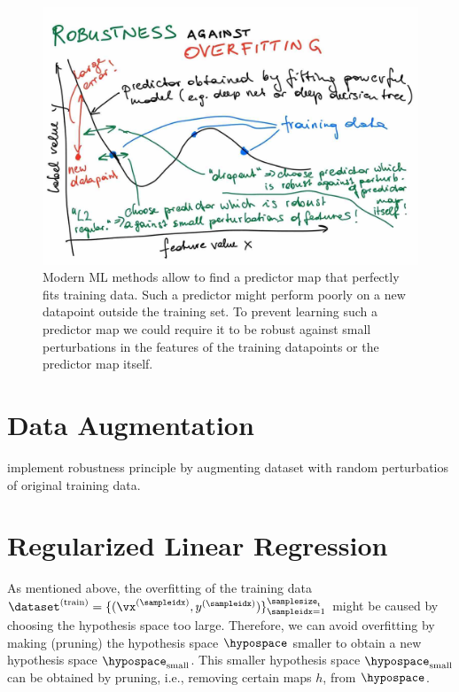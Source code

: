 \documentclass[12pt]{report}
\begin{document}
 \begin{figure}[htbp]
	\centering
	\includegraphics[width=\textwidth]{RobustnessOverfitting.jpg}  
	\caption{Modern ML methods allow to find a predictor map that perfectly fits 
		training data. Such a predictor might perform poorly on a new datapoint 
		outside the training set. To prevent learning such a predictor 
		map we could require it to be robust against small perturbations in the features of the 
        training datapoints or the predictor map itself.}
	\label{fig_polyn_training}
\end{figure}

\section{Data Augmentation} 
\label{sec_data_augmentation} 
implement robustness principle by augmenting dataset with random perturbatios of original training data. 



\section{Regularized Linear Regression}
\label{sec_regularization}

As mentioned above, the overfitting of the training data 
$\dataset^{(\rm train)}=\{(\vx^{(\sampleidx)},y^{(\sampleidx)})\}_{\sampleidx=1}^{\samplesize_{\rm t}}$ 
might be caused by choosing the hypothesis space too large. Therefore, we can avoid 
overfitting by making (pruning) the hypothesis space $\hypospace$ smaller to obtain a new 
hypothesis space $\hypospace_{\rm small}$. This smaller hypothesis space $\hypospace_{\rm small}$ 
can be obtained by pruning, i.e., removing certain maps $h$, from $\hypospace$. 
\end{document}
